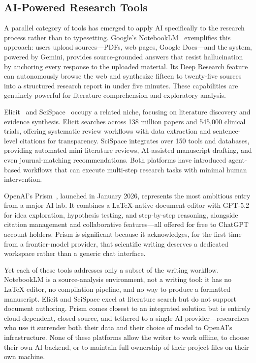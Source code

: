 \documentclass[a4paper,11pt]{article}
\begin{document}
\subsection{AI-Powered Research Tools}

A parallel category of tools has emerged to apply AI specifically to the research process rather than to typesetting. Google's NotebookLM~\cite{NotebookLM} exemplifies this approach: users upload sources---PDFs, web pages, Google Docs---and the system, powered by Gemini, provides source-grounded answers that resist hallucination by anchoring every response to the uploaded material. Its Deep Research feature can autonomously browse the web and synthesize fifteen to twenty-five sources into a structured research report in under five minutes. These capabilities are genuinely powerful for literature comprehension and exploratory analysis.

Elicit~\cite{Elicit} and SciSpace~\cite{SciSpace} occupy a related niche, focusing on literature discovery and evidence synthesis. Elicit searches across 138 million papers and 545,000 clinical trials, offering systematic review workflows with data extraction and sentence-level citations for transparency. SciSpace integrates over 150 tools and databases, providing automated mini literature reviews, AI-assisted manuscript drafting, and even journal-matching recommendations. Both platforms have introduced agent-based workflows that can execute multi-step research tasks with minimal human intervention.

OpenAI's Prism~\cite{OpenAIPrism}, launched in January 2026, represents the most ambitious entry from a major AI lab. It combines a LaTeX-native document editor with GPT-5.2 for idea exploration, hypothesis testing, and step-by-step reasoning, alongside citation management and collaborative features---all offered for free to ChatGPT account holders. Prism is significant because it acknowledges, for the first time from a frontier-model provider, that scientific writing deserves a dedicated workspace rather than a generic chat interface.

Yet each of these tools addresses only a subset of the writing workflow. NotebookLM is a source-analysis environment, not a writing tool: it has no LaTeX editor, no compilation pipeline, and no way to produce a formatted manuscript. Elicit and SciSpace excel at literature search but do not support document authoring. Prism comes closest to an integrated solution but is entirely cloud-dependent, closed-source, and tethered to a single AI provider---researchers who use it surrender both their data and their choice of model to OpenAI's infrastructure. None of these platforms allow the writer to work offline, to choose their own AI backend, or to maintain full ownership of their project files on their own machine.
\end{document}
